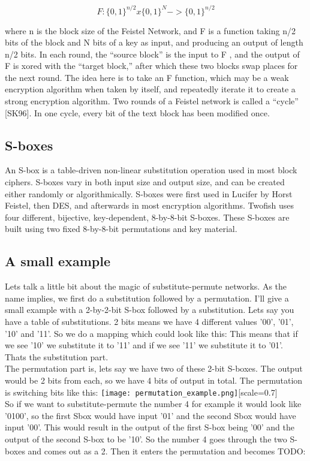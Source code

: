 \begin{equation*}
  F : \lbrace 0, 1\rbrace^{n/2} x \lbrace0, 1\rbrace^N -> \lbrace 0, 1\rbrace^{n/2}
\end{equation*}

where n is the block size of the Feistel Network, and F is a function taking n/2 bits of the block and N bits of a key as input, and producing an output of length n/2 bits. In each round, the “source block” is the input to F , and the output of F is xored with the “target block,” after which these two blocks swap places for the next round. The idea here is to take an F function, which may be a weak encryption algorithm when taken by itself, and repeatedly iterate it to create a strong encryption algorithm.  Two rounds of a Feistel network is called a “cycle” [SK96]. In one cycle, every bit of the text block has been modified once.

\subsection{S-boxes}
An S-box is a table-driven non-linear substitution operation used in most block ciphers. S-boxes vary in both input size and output size, and can be created either randomly or algorithmically. S-boxes were first used in Lucifer by Horst Feistel, then DES, and afterwards in most encryption algorithms. Twofish uses four different, bijective, key-dependent, 8-by-8-bit S-boxes. These S-boxes are built using two fixed 8-by-8-bit permutations and key material.

\subsection{A small example}
Lets talk a little bit about the magic of substitute-permute networks. As the name implies, we first do a substitution followed by a permutation. I'll give a small example with a 2-by-2-bit S-box followed by a substitution.
Lets say you have a table of substitutions. 2 bits means we have 4 different values '00', '01', '10' and '11'.
So we do a mapping which could look like this:
This means that if we see '10' we substitute it to '11' and if we see '11' we substitute it to '01'. Thats the substitution part. \\
The permutation part is, lets say we have two of these 2-bit S-boxes. The output would be 2 bits from each, so we have 4 bits of output in total. The permutation is switching bits like this:
\texttt{[image: permutation\_example.png]}[scale=0.7] \\
So if we want to substitute-permute the number 4 for example it would look like '0100', so the first Sbox would have input '01' and the second Sbox would have input '00'. This would result in the output of the first S-box being '00' and the output of the second S-box to be '10'. So the number 4 goes through the two S-boxes and comes out as a 2. Then it enters the permutation and becomes TODO:

